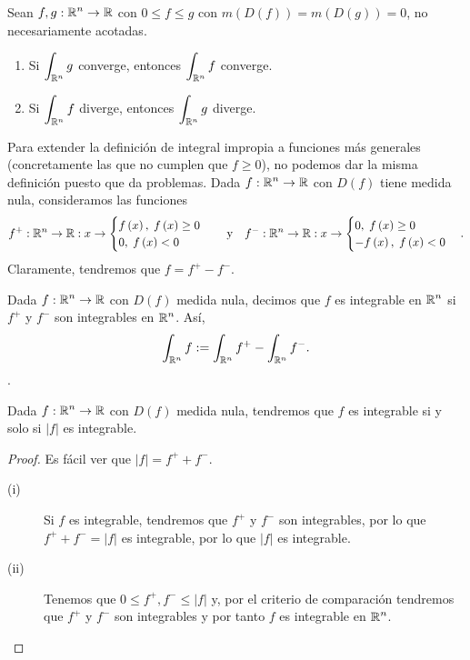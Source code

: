 \begin{prop}
Sean $\displaystyle f,g : \mathbb{R}^{n} \to \mathbb{R} $ con $\displaystyle 0\leq f\leq g $ con $\displaystyle m\left(D\left(f\right)\right)=m\left(D\left(g\right)\right)=0 $, no necesariamente acotadas. 
\begin{enumerate}
\item Si $\displaystyle \int _{\mathbb{R}^{n}}g  $ converge, entonces $\displaystyle \int _{\mathbb{R}^{n}}f  $ converge.
\item Si $\displaystyle \int _{\mathbb{R}^{n}}f  $ diverge, entonces $\displaystyle \int _{\mathbb{R}^{n}}g $ diverge.
\end{enumerate}
\end{prop}
Para extender la definición de integral impropia a funciones más generales (concretamente las que no cumplen que $\displaystyle f \geq 0 $), no podemos dar la misma definición puesto que da problemas.
Dada $\displaystyle f : \mathbb{R}^{n} \to \mathbb{R} $ con $\displaystyle D\left(f\right) $ tiene medida nula, consideramos las funciones
\[f^{+}:\mathbb{R}^{n}\to \mathbb{R} : x \to 
\begin{cases}
f\left(x\right), \; f\left(x\right)\geq 0 \\
0, \; f\left(x\right)<0
\end{cases}
\quad
\text{y} \quad f^{-}:\mathbb{R}^{n}\to \mathbb{R} : x \to 
\begin{cases}
0, \; f\left(x\right)\geq 0 \\
-f\left(x\right), \; f\left(x\right)<0
\end{cases}
.\]
Claramente, tendremos que $\displaystyle f = f^{+}-f^{-} $. 
\begin{definition}
Dada $\displaystyle f : \mathbb{R}^{n} \to \mathbb{R} $ con $\displaystyle D\left(f\right) $ medida nula, decimos que $\displaystyle f $ es integrable en $\displaystyle \mathbb{R}^{n} $ si $\displaystyle f^{+} $ y $\displaystyle f^{-} $ son integrables en $\displaystyle \mathbb{R}^{n} $. Así, 
\[\int _{\mathbb{R}^{n}}f :=\int _{\mathbb{R}^{n}}f^{+} -\int _{\mathbb{R}^{n}}f^{-}  .\]. %
\end{definition}
\begin{prop}
Dada $\displaystyle f : \mathbb{R}^{n} \to \mathbb{R} $ con $\displaystyle D\left(f\right) $ medida nula, tendremos que $\displaystyle f $ es integrable si y solo si $\displaystyle \left|f\right| $ es integrable.
\end{prop}
\begin{proof}
Es fácil ver que $\displaystyle \left|f\right|=f^{+}+f^{-} $. 
\begin{description}
\item[(i)] Si $\displaystyle f $ es integrable, tendremos que $\displaystyle f^{+} $ y $\displaystyle f^{-} $ son integrables, por lo que $\displaystyle f^{+}+f^{-}= \left|f\right| $ es integrable, por lo que $\displaystyle \left|f\right| $ es integrable.
\item[(ii)] Tenemos que $\displaystyle 0 \leq f^{+}, f^{-}\leq \left|f\right| $ y, por el criterio de comparación tendremos que $\displaystyle f^{+} $ y $\displaystyle f^{-} $ son integrables y por tanto $\displaystyle f $ es integrable en $\displaystyle \mathbb{R}^{n} $. 
\end{description}
\end{proof}
